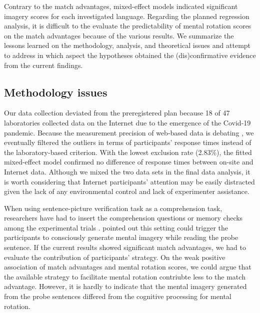 \documentclass[
  man,floatsintext]{apa6}
\begin{document}
Contrary to the match advantages, mixed-effect models indicated significant imagery scores for each investigated language. Regarding the planned regression analysis, it is difficult to the evaluate the predictability of mental rotation scores on the match advantages because of the various results. We summarize the lessons learned on the methodology, analysis, and theoretical issues and attempt to address in which aspect the hypotheses obtained the (dis)confirmative evidence from the current findings.

\hypertarget{methodology-issues}{%
\subsection{Methodology issues}\label{methodology-issues}}

Our data collection deviated from the preregistered plan because 18 of 47 laboratories collected data on the Internet due to the emergence of the Covid-19 pandemic. Because the measurement precision of web-based data is debating \autocites[e.g.,][]{anwyl-irvineGorillaOurMidst2020,bridgesTimingMegastudyComparing2020a,deleeuwPsychophysicsWebBrowser2016}, we eventually filtered the outliers in terms of participants' response times instead of the laboratory-based criterion. With the lowest exclusion rate (2.83\%), the fitted mixed-effect model confirmed no difference of response times between on-site and Internet data. Although we mixed the two data sets in the final data analysis, it is worth considering that Internet participants' attention may be easily distracted given the lack of any environmental control and lack of experimenter assistance.

When using sentence-picture verification task as a comprehension task, researchers have had to insert the comprehension questions or memory checks among the experimental trials \autocite{chenDoesObjectSize2020,stanfield_effect_2001}. \textcite{kaschakEmbodimentLabTheory2021} pointed out this setting could trigger the participants to consciously generate mental imagery while reading the probe sentence. If the current results showed significant match advantages, we had to evaluate the contribution of participants' strategy. On the weak positive association of match advantages and mental rotation scores, we could argue that the available strategy to facilitate mental rotation contriubte less to the match advantage. However, it is hardly to indicate that the mental imagery generated from the probe sentences differed from the cognitive processing for mental rotation.
\end{document}
